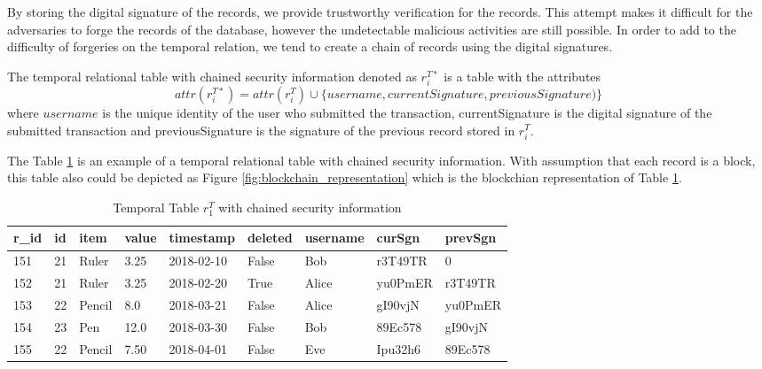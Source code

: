 		By storing the digital signature of the records, we provide trustworthy verification for the records. This attempt makes it difficult for the adversaries to forge the records of the database, however the undetectable malicious activities are still possible. In order to add to the difficulty of forgeries on the temporal relation, we tend to create a chain of records using the digital signatures.

			\begin{defn}
				The temporal relational table with chained security information denoted as $r_i^{T*}$ is a table with the attributes $$attr(r_i^{T*}) = attr(r_i^T) \cup \{username,currentSignature, previousSignature)\}$$ where $username$ is the unique identity of the user who submitted the transaction, currentSignature is the digital signature of the submitted transaction and previousSignature is the signature of the previous record stored in $r_i^T$. 
			\label{defn:temporal_blockchain}
			\end{defn}

			\begin{example} 
				The Table \ref{temporal_blockchain_table} is an example of a temporal relational table with chained security information. With assumption that each record is a block, this table also could be depicted as Figure \ref{fig:blockchain_representation} which is the blockchian representation of Table \ref{temporal_blockchain_table}.
			\label{example:blockchain}
			\end{example}

			\begin{center}
			\begin{table}
				\centering
				\footnotesize
				\caption{Temporal Table $r_1^T$ with chained security information}
				\label{temporal_blockchain_table}
				\begin{tabular}{p{0.5cm}p{0.5cm}p{1cm}p{0.5cm}p{1.7cm}p{1.7cm}p{1.5cm}p{1.5cm}p{1.5cm}}
					\hline
					r\_id & id & item      & value  & timestamp  & deleted & username & curSgn & prevSgn \\ \hline
					151& 21 & Ruler    & 3.25  & 2018-02-10  &  False & Bob &r3T49TR & 0\\  
					152& 21 & Ruler    & 3.25  & 2018-02-20  & True  & Alice & yu0PmER & r3T49TR\\
					153& 22 & Pencil    & 8.0  & 2018-03-21  &  False & Alice & gI90vjN & yu0PmER\\
					154& 23 & Pen    & 12.0  & 2018-03-30  &  False & Bob & 89Ec578 & gI90vjN\\
					155& 22 & Pencil & 7.50  & 2018-04-01 & False & Eve & Ipu32h6 & 89Ec578\\ \hline
				\end{tabular}
			\end{table} 
			\end{center}


